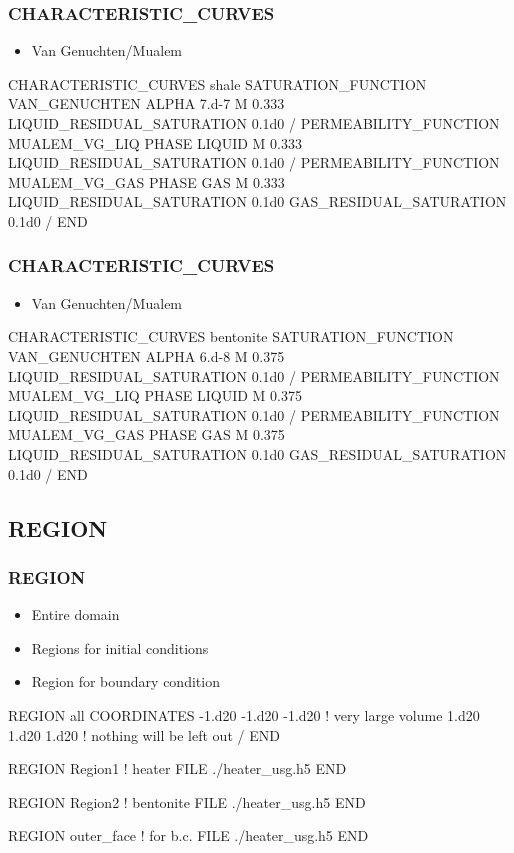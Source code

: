 \documentclass{beamer}
\newcommand\bluecomment[1]{{{\color{blue} #1}}}
\begin{document}
\begin{frame}\frametitle{CHARACTERISTIC\_CURVES}
\begin{itemize}
  \item Van Genuchten/Mualem
\end{itemize}
\begin{semiverbatim}\small
CHARACTERISTIC_CURVES shale
  SATURATION_FUNCTION VAN_GENUCHTEN
    ALPHA 7.d-7
    M 0.333
    LIQUID_RESIDUAL_SATURATION 0.1d0
  /
  PERMEABILITY_FUNCTION MUALEM_VG_LIQ
    PHASE LIQUID
    M 0.333
    LIQUID_RESIDUAL_SATURATION 0.1d0
  /
  PERMEABILITY_FUNCTION MUALEM_VG_GAS
    PHASE GAS
    M 0.333
    LIQUID_RESIDUAL_SATURATION 0.1d0
    GAS_RESIDUAL_SATURATION 0.1d0
  /
END
\end{semiverbatim}
\end{frame}

\begin{frame}\frametitle{CHARACTERISTIC\_CURVES}
\begin{itemize}
  \item Van Genuchten/Mualem
\end{itemize}
\begin{semiverbatim}\small
CHARACTERISTIC_CURVES bentonite
  SATURATION_FUNCTION VAN_GENUCHTEN
    ALPHA 6.d-8
    M 0.375
    LIQUID_RESIDUAL_SATURATION 0.1d0
  /
  PERMEABILITY_FUNCTION MUALEM_VG_LIQ
    PHASE LIQUID
    M 0.375
    LIQUID_RESIDUAL_SATURATION 0.1d0
  /
  PERMEABILITY_FUNCTION MUALEM_VG_GAS
    PHASE GAS
    M 0.375
    LIQUID_RESIDUAL_SATURATION 0.1d0
    GAS_RESIDUAL_SATURATION 0.1d0
  /
END
\end{semiverbatim}
\end{frame}
\subsection{REGION}

\begin{frame}[fragile]\frametitle{REGION}
\begin{itemize}
  \item{Entire domain}
  \item{Regions for initial conditions}
  \item{Region for boundary condition}
\end{itemize}

\begin{semiverbatim}\small
REGION all
  COORDINATES
    -1.d20 -1.d20 -1.d20 \bluecomment{! very large volume}
     1.d20  1.d20  1.d20 \bluecomment{! nothing will be left out}
  /
END

REGION Region1 \bluecomment{! heater}
  FILE ./heater_usg.h5
END

REGION Region2 \bluecomment{! bentonite}
  FILE ./heater_usg.h5
END

REGION outer_face \bluecomment{! for b.c.}
  FILE ./heater_usg.h5
END
\end{semiverbatim}
\end{frame}
\end{document}
